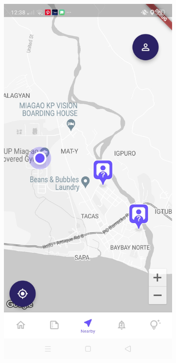 \begin{figure}[!h]
    \centering
    \begin{subfigure}[c]{0.30\linewidth}
        \centering
        \includegraphics[scale=0.15]{figures/Chapter4/Main/Nearby-3.jpg}

\end{subfigure}
\end{figure}
